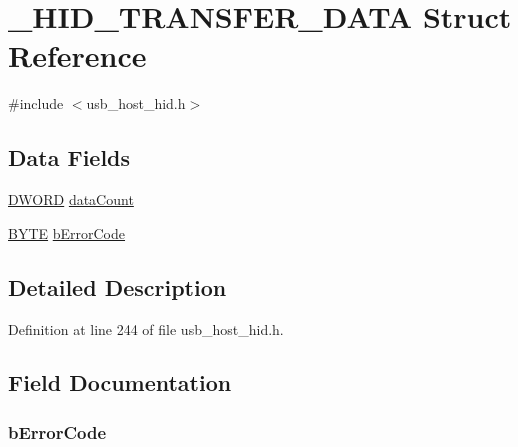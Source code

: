 \hypertarget{struct___h_i_d___t_r_a_n_s_f_e_r___d_a_t_a}{}\section{\+\_\+\+H\+I\+D\+\_\+\+T\+R\+A\+N\+S\+F\+E\+R\+\_\+\+D\+A\+T\+A Struct Reference}
\label{struct___h_i_d___t_r_a_n_s_f_e_r___d_a_t_a}


{\ttfamily \#include $<$usb\+\_\+host\+\_\+hid.\+h$>$}

\subsection*{Data Fields}
\begin{DoxyCompactItemize}
\item 
\hyperlink{_generic_type_defs_8h_ad342ac907eb044443153a22f964bf0af}{D\+W\+O\+R\+D} \hyperlink{struct___h_i_d___t_r_a_n_s_f_e_r___d_a_t_a_ae06ef282125e03d753ff6ad3acff2241}{data\+Count}
\item 
\hyperlink{_generic_type_defs_8h_a4ae1dab0fb4b072a66584546209e7d58}{B\+Y\+T\+E} \hyperlink{struct___h_i_d___t_r_a_n_s_f_e_r___d_a_t_a_aba3e0f90a1105d1fb6a5ba7a769cf368}{b\+Error\+Code}
\end{DoxyCompactItemize}


\subsection{Detailed Description}


Definition at line 244 of file usb\+\_\+host\+\_\+hid.\+h.



\subsection{Field Documentation}
\hypertarget{struct___h_i_d___t_r_a_n_s_f_e_r___d_a_t_a_aba3e0f90a1105d1fb6a5ba7a769cf368}{}
\subsubsection[{b\+Error\+Code}]{ b\+Error\+Code}\label{struct___h_i_d___t_r_a_n_s_f_e_r___d_a_t_a_aba3e0f90a1105d1fb6a5ba7a769cf368}


